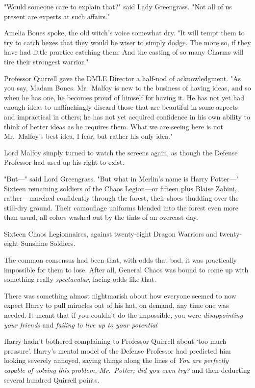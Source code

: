 "Would someone care to explain that?" said Lady Greengrass. "Not all of us
present are experts at such{\el} affairs."

Amelia Bones spoke, the old witch's voice somewhat dry. "It will tempt them to
try to catch hexes that they would be wiser to simply dodge. The more so, if
they have had little practice catching them. And the casting of so many Charms
will tire their strongest warrior."

Professor Quirrell gave the DMLE Director a half-nod of acknowledgment. "As you
say, Madam Bones. Mr.~Malfoy is new to the business of having ideas, and so
when he has one, he becomes proud of himself for having it. He has not yet had
enough ideas to unflinchingly discard those that are beautiful in some aspects
and impractical in others; he has not yet acquired confidence in his own
ability to think of better ideas as he requires them. What we are seeing here
is not Mr.~Malfoy's best idea, I fear, but rather his only idea."

Lord Malfoy simply turned to watch the screens again, as though the Defense
Professor had used up his right to exist.

"But—" said Lord Greengrass. "But what in Merlin's name is Harry Potter—"
\sbreak
Sixteen remaining soldiers of the Chaos Legion—or fifteen plus Blaise Zabini,
rather—marched confidently through the forest, their shoes thudding over the
still-dry ground. Their camouflage uniforms blended into the forest even more
than usual, all colors washed out by the tints of an overcast day.

Sixteen Chaos Legionnaires, against twenty-eight Dragon Warriors and
twenty-eight Sunshine Soldiers.

The common consensus had been that, with odds that bad, it was practically
impossible for them to lose. After all, General Chaos was bound to come up with
something really \emph{spectacular,} facing odds like that.

There was something almost nightmarish about how everyone seemed to now expect
Harry to pull miracles out of his hat, on demand, any time one was needed. It
meant that if you couldn't do the impossible, you were \emph{disappointing your
friends} and \emph{failing to live up to your potential{\el}}

Harry hadn't bothered complaining to Professor Quirrell about `too much
pressure'. Harry's mental model of the Defense Professor had predicted him
looking severely annoyed, saying things along the lines of \emph{You are
perfectly capable of solving this problem, Mr.~Potter; did you even try?} and
then deducting several hundred Quirrell points.

